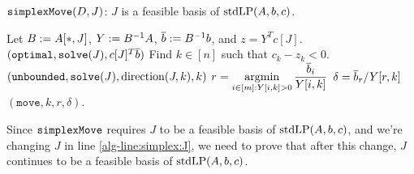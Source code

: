 \begin{algorithm}[H]
\caption{$\operatorname{\mathtt{simplexMove}}(D, J)$:
$J$ is a feasible basis of $\operatorname{stdLP}(A, b, c)$.}
\begin{algorithmic}[1]
\State Let $B := A[*, J]$, $Y := B^{-1}A$, $\overline{b} := B^{-1}b$, and $z = Y^Tc[J]$.
    \State\label{alg-line:simplexMove:opt}\Return $(\mathtt{optimal}, \operatorname{\mathtt{solve}}(J), c[J]^T\overline{b})$
\EndIf
\State Find $k \in [n]$ such that $c_k - z_k < 0$.
\label{alg-line:simplexMove:Y-neg}
    \State\label{alg-line:simplexMove:unb}%
\Return $(\mathtt{unbounded}, \operatorname{\mathtt{solve}}(J), \operatorname{direction}(J, k), k)$
\EndIf
\State $\displaystyle r = \operatorname*{argmin}_{i \in [m]: Y[i, k] > 0} \frac{\overline{b}_i}{Y[i, k]}$
\State $\delta = \overline{b}_r/Y[r, k]$
\State \Return $(\mathtt{move}, k, r, \delta)$.
\end{algorithmic}
\label{algo:simplexMove}
\end{algorithm}

Since $\operatorname{\mathtt{simplexMove}}$ requires $J$ to be a feasible basis of $\operatorname{stdLP}(A, b, c)$,
and we're changing $J$ in line \ref{alg-line:simplex:J}, we need to prove
that after this change, $J$ continues to be a feasible basis of $\operatorname{stdLP}(A, b, c)$.

